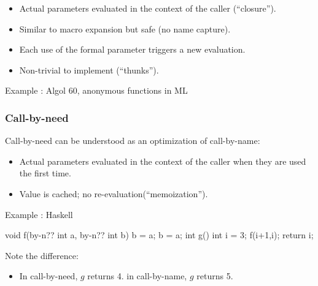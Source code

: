 \documentclass{beamer}
\begin{document}
\begin{frame}[fragile]
\begin{itemize}
\item Actual parameters evaluated in the context of the caller 
(``closure'').
\item Similar to macro expansion but safe (no name capture). 
\item Each use  of the formal parameter triggers a new
evaluation. 
\item Non-trivial to implement (``thunks''). 
\end{itemize}

 Example : Algol 60, anonymous functions in ML
\bigskip

\end{frame}

\begin{frame}[fragile]
\frametitle{Call-by-need}
Call-by-need can be understood as an optimization of
call-by-name:

\begin{itemize}
\item Actual parameters evaluated in the context of the caller
when they are used the first time.
\item Value is cached; no re-evaluation(``memoization''). 
\end{itemize}

 Example : Haskell

\begin{cplus3}

void f(by-n?? int a, by-n?? int b) {
    b = a;
    b = a;
}
int g() {
    int i = 3;
    f(i+1,i);
    return i;
}
\end{cplus3}
Note the difference:
\begin{itemize}
\item In call-by-need, $g$ returns 4.
in call-by-name, $g$ returns 5.

\end{itemize}





\end{frame}

\end{document}
